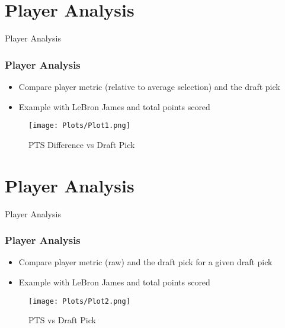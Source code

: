 \documentclass{beamer}
\begin{document}
\section{Player Analysis}
\begin{frame}{Player Analysis}
    \frametitle{Player Analysis}
    
      \begin{itemize}
        \item Compare player metric (relative to average selection) and the draft pick
        \item Example with LeBron James and total points scored
      \end{itemize}
    
      \begin{figure}
        \texttt{[image: Plots/Plot1.png]}
        \caption{PTS Difference vs Draft Pick}
      \end{figure}
    
\end{frame}


\section{Player Analysis}
\begin{frame}{Player Analysis}
    \frametitle{Player Analysis}
    
      \begin{itemize}
        \item Compare player metric (raw) and the draft pick for a given draft pick
        \item Example with LeBron James and total points scored
      \end{itemize}
    
      \begin{figure}
        \texttt{[image: Plots/Plot2.png]}
        \caption{PTS vs Draft Pick}
      \end{figure}
    
\end{frame}
\end{document}
